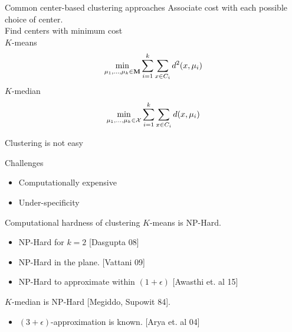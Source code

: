 \documentclass{beamer}
\newcommand{\mc}{\mathcal}
\newcommand{\mb}{\mathbf}
\begin{document}
\begin{frame}{Common center-based clustering approaches}
	Associate cost with each possible choice of center.\\
	\vspace{0.5cm}Find centers with minimum cost\\

	\vspace{1cm}$K$-means $$\min_{\mu_1, \ldots, \mu_k \in \mb M} \sum_{i =1}^k \sum_{x \in C_i} d^2(x, \mu_i)\vspace{1cm}$$
	$K$-median $$\min_{\mu_1, \ldots, \mu_k \in \mc X} \sum_{i =1}^k \sum_{x \in C_i} d(x, \mu_i)\vspace{0.5cm}$$
\end{frame}

\begin{frame}{Clustering is not easy}

  {\color{red}Challenges }
  \vspace{0.4cm}
  \begin{itemize}
    \item Computationally expensive
    \vspace{1.5cm}
	\item Under-specificity
  \end{itemize}
\end{frame}

\begin{frame}{Computational hardness of clustering}
	\onslide<1>$K$-means is NP-Hard.
	\begin{itemize}
		\item NP-Hard for $k=2$ \alert{[Dasgupta 08]}
		\vspace{0.4cm}\item NP-Hard in the plane. \alert{[Vattani 09]}
		\vspace{0.4cm}\item NP-Hard to approximate within $(1+\epsilon)$ \alert{[Awasthi et. al 15]}
	\end{itemize} 
	
	\vspace{1cm}$K$-median is NP-Hard \alert{[Megiddo, Supowit 84]}.
	\begin{itemize}
		\vspace{0.4cm}\item $(3+\epsilon)$-approximation is known. \alert{[Arya et. al 04]}
	\end{itemize}
\end{frame}
\end{document}
